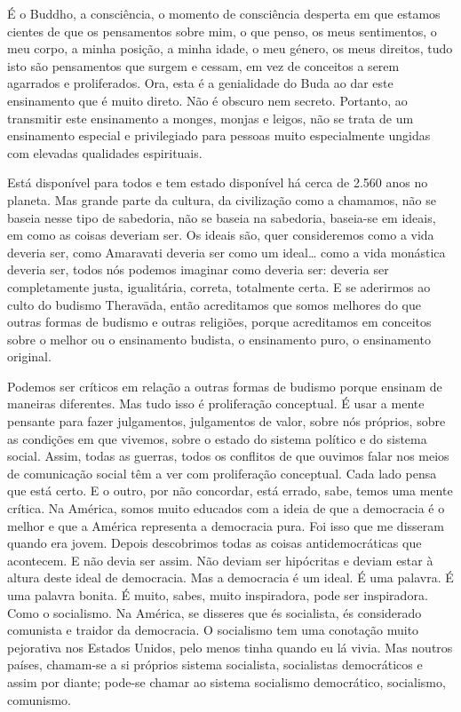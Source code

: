 É o Buddho, a consciência, o momento de consciência desperta em que estamos
cientes de que os pensamentos sobre mim, o que penso, os meus sentimentos, o meu
corpo, a minha posição, a minha idade, o meu género, os meus direitos, tudo isto
são pensamentos que surgem e cessam, em vez de conceitos a serem agarrados e
proliferados. Ora, esta é a genialidade do Buda ao dar este ensinamento que é
muito direto. Não é obscuro nem secreto. Portanto, ao transmitir este
ensinamento a monges, monjas e leigos, não se trata de um ensinamento especial e
privilegiado para pessoas muito especialmente ungidas com elevadas qualidades
espirituais.

Está disponível para todos e tem estado disponível há cerca de 2.560 anos no
planeta. Mas grande parte da cultura, da civilização como a chamamos, não se
baseia nesse tipo de sabedoria, não se baseia na sabedoria, baseia-se em
ideais, em como as coisas deveriam ser. Os ideais são, quer consideremos como a
vida deveria ser, como Amaravati deveria ser como um ideal\ldots{} como a vida
monástica deveria ser, todos nós podemos imaginar como deveria ser: deveria ser
completamente justa, igualitária, correta, totalmente certa. E se aderirmos ao
culto do budismo Theravāda, então acreditamos que somos melhores do que outras
formas de budismo e outras religiões, porque acreditamos em conceitos sobre o
melhor ou o ensinamento budista, o ensinamento puro, o ensinamento original.

Podemos ser críticos em relação a outras formas de budismo porque ensinam de
maneiras diferentes. Mas tudo isso é proliferação conceptual. É usar a mente
pensante para fazer julgamentos, julgamentos de valor, sobre nós próprios, sobre
as condições em que vivemos, sobre o estado do sistema político e do sistema
social. Assim, todas as guerras, todos os conflitos de que ouvimos falar nos
meios de comunicação social têm a ver com proliferação conceptual. Cada lado
pensa que está certo. E o outro, por não concordar, está errado, sabe, temos uma
mente crítica. Na América, somos muito educados com a ideia de que a democracia
é o melhor e que a América representa a democracia pura. Foi isso que me
disseram quando era jovem. Depois descobrimos todas as coisas antidemocráticas
que acontecem. E não devia ser assim. Não deviam ser hipócritas e deviam estar à
altura deste ideal de democracia. Mas a democracia é um ideal. É uma palavra. É
uma palavra bonita. É muito, sabes, muito inspiradora, pode ser inspiradora.
Como o socialismo. Na América, se disseres que és socialista, és considerado
comunista e traidor da democracia. O socialismo tem uma conotação muito
pejorativa nos Estados Unidos, pelo menos tinha quando eu lá vivia. Mas noutros
países, chamam-se a si próprios sistema socialista, socialistas democráticos e
assim por diante; pode-se chamar ao sistema socialismo democrático, socialismo,
comunismo.

